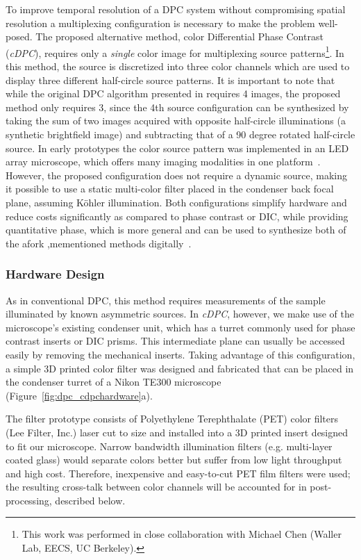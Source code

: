To improve temporal resolution of a DPC system without compromising spatial resolution a multiplexing configuration is necessary to make the problem well-posed. The proposed alternative method, color Differential Phase Contrast (\textit{cDPC}), requires only a \emph{single} color image for multiplexing source patterns\footnote{This work was performed in close collaboration with Michael Chen (Waller Lab, EECS, UC Berkeley).}. In this method, the source is discretized into three color channels which are used to display three different half-circle source patterns. It is important to note that while the original DPC algorithm presented in \cite{tian2015quantitative} requires 4 images, the proposed method only requires 3, since the 4th source configuration can be synthesized by taking the sum of two images acquired with opposite half-circle illuminations (a synthetic brightfield image) and subtracting that of a 90 degree rotated half-circle source. In early prototypes the color source pattern was implemented in an LED array microscope, which offers many imaging modalities in one platform~\cite{Tian14,zijiMulti,tian2015quantitative,Ma:15,phillips2015multi, Zheng2011, Zheng2013}. However, the proposed configuration does not require a dynamic source, making it possible to use a static multi-color filter placed in the condenser back focal plane, assuming K\"{o}hler illumination. Both configurations simplify hardware and reduce costs significantly as compared to phase contrast or DIC, while providing quantitative phase, which is more general and can be used to synthesize both of the afork ,mementioned methods digitally~\cite{JMI:JMI1027}.

\subsubsection{Hardware Design}
As in conventional DPC, this method requires measurements of the sample illuminated by known asymmetric sources. In \textit{cDPC}, however, we make use of the microscope's existing condenser unit, which has a turret commonly used for phase contrast inserts or DIC prisms. This intermediate plane can usually be accessed easily by removing the mechanical inserts. Taking advantage of this configuration, a simple 3D printed color filter was designed and fabricated that can be placed in the condenser turret of a Nikon TE300 microscope (Figure~\ref{fig:dpc_cdpchardware}a).

The filter prototype consists of Polyethylene Terephthalate (PET) color filters (Lee Filter, Inc.) laser cut to size and installed into a 3D printed insert designed to fit our microscope. Narrow bandwidth illumination filters (e.g. multi-layer coated glass) would separate colors better but suffer from low light throughput and high cost. Therefore, inexpensive and easy-to-cut PET film filters were used; the resulting cross-talk between color channels will be accounted for in post-processing, described below.

